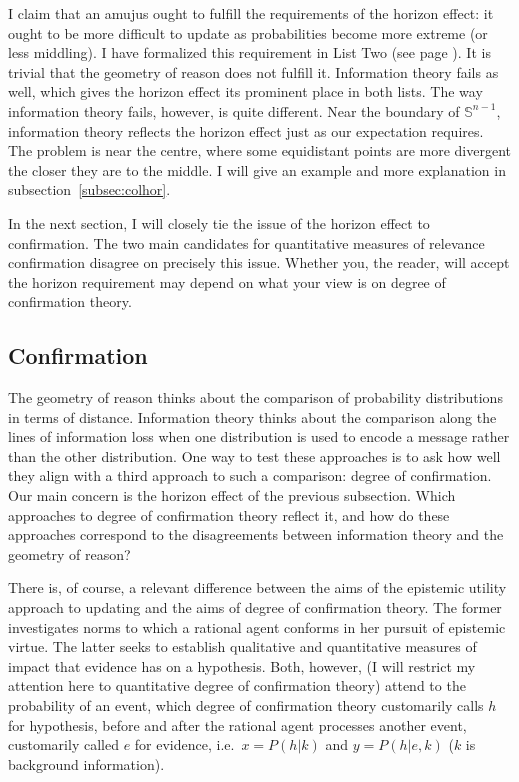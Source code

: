 \documentclass[phd,12pt,oneside]{ubcthesis}
\begin{document}
I claim that an amujus ought to fulfill the requirements of the
horizon effect: it ought to be more difficult to update as
probabilities become more extreme (or less middling). I have
formalized this requirement in List Two (see page
\pageref{page:listtwo}). It is trivial that the geometry of reason
does not fulfill it. Information theory fails as well, which gives the
horizon effect its prominent place in both lists. The way information
theory fails, however, is quite different. Near the boundary of
$\mathbb{S}^{n-1}$, information theory reflects the horizon effect
just as our expectation requires. The problem is near the centre,
where some equidistant points are more divergent the closer they are
to the middle. I will give an example and more explanation in
subsection~\ref{subsec:colhor}.

In the next section, I will closely tie the issue of the horizon
effect to confirmation. The two main candidates for quantitative
measures of relevance confirmation disagree on precisely this issue.
Whether you, the reader, will accept the horizon requirement may
depend on what your view is on degree of confirmation theory.

\subsection{Confirmation}
\label{subsec:ooraisoh}

The geometry of reason thinks about the comparison of probability
distributions in terms of distance. Information theory thinks about
the comparison along the lines of information loss when one
distribution is used to encode a message rather than the other
distribution. One way to test these approaches is to ask how well they
align with a third approach to such a comparison: degree of
confirmation. Our main concern is the horizon effect of the previous
subsection. Which approaches to degree of confirmation theory reflect
it, and how do these approaches correspond to the disagreements
between information theory and the geometry of reason?

There is, of course, a relevant difference between the aims of the
epistemic utility approach to updating and the aims of degree of
confirmation theory. The former investigates norms to which a rational
agent conforms in her pursuit of epistemic virtue. The latter seeks to
establish qualitative and quantitative measures of impact that
evidence has on a hypothesis. Both, however, (I will restrict my
attention here to quantitative degree of confirmation theory) attend
to the probability of an event, which degree of confirmation theory
customarily calls $h$ for hypothesis, before and after the rational
agent processes another event, customarily called $e$ for evidence,
i.e.\ $x=P(h|k)$ and $y=P(h|e,k)$ ($k$ is background information).
\end{document}

